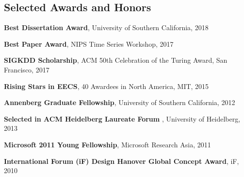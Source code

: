 \documentclass[margin,line]{res}
\newenvironment{list1}{
  \begin{list}{\ding{113}}{%
      \setlength{\itemsep}{0in}
      \setlength{\parsep}{0in} \setlength{\parskip}{0in}
      \setlength{\topsep}{0in} \setlength{\partopsep}{0in} 
      \setlength{\leftmargin}{0.17in}}}{\end{list}}
\begin{document}
\begin{resume}


\section{\sc Selected Awards and Honors} 

\textbf{Best Dissertation Award}, University of Southern California, 2018

\textbf{Best Paper Award},  NIPS Time Series Workshop, 2017

\textbf{SIGKDD Scholarship},  ACM 50th Celebration of the Turing Award, San Francisco, 2017

\textbf{Rising Stars in EECS},  40 Awardees in North America, MIT, 2015

\textbf{Annenberg Graduate Fellowship}, University of Southern California, 2012







%

\textbf{Selected in ACM Heidelberg Laureate Forum }, University of Heidelberg, 2013


\textbf{Microsoft 2011 Young Fellowship}, Microsoft Research Asia, 2011


\textbf{International Forum (iF) Design Hanover Global Concept Award}, iF, 2010 


\end{resume}
\end{document}
